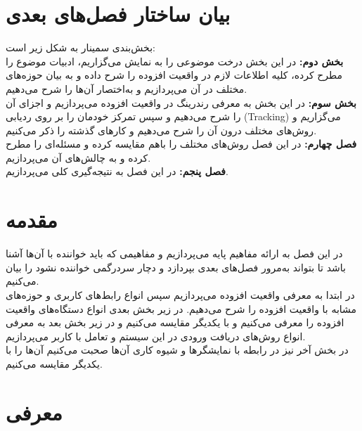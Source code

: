 \section{بیان ساختار فصل‌های بعدی}
بخش‌بندی سمینار به شکل زیر است:
\\
\textbf{
	بخش دوم:} در این بخش درخت موضوعی را به نمایش می‌گزاریم، ادبیات موضوع را مطرح کرده، کلیه اطلاعات لازم در واقعیت افزوده را شرح داده و به بیان حوزه‌های مختلف در آن می‌پردازیم و به‌اختصار آن‌ها را شرح می‌دهیم.
\\
\textbf{
	بخش سوم: } در این بخش به معرفی رندرینگ در واقعیت افزوده می‌پردازیم و اجزای آن را شرح می‌دهیم و سپس تمرکز خودمان را بر روی ردیابی (Tracking) می‌گزاریم و روش‌های مختلف درون آن را شرح می‌دهیم و کارهای گذشته را ذکر می‌کنیم.
\\
\textbf{
	فصل چهارم:} در این فصل روش‌های مختلف را باهم مقایسه کرده و مسئله‌ای را مطرح کرده و به چالش‌های آن می‌پردازیم.
\\
\textbf{
	فصل پنجم:} در این فصل به نتیجه‌گیری کلی می‌پردازیم.

\section{مقدمه}
در این فصل به ارائه مفاهیم پایه می‌پردازیم و مفاهیمی که  باید خواننده با آن‌ها آشنا باشد تا بتواند به‌مرور فصل‌های بعدی بپردازد و دچار سردرگمی خواننده نشود را بیان می‌کنیم.
\\
در ابتدا به معرفی واقعیت افزوده می‌پردازیم سپس انواع رابط‌های کاربری و حوزه‌های مشابه با واقعیت افزوده را شرح می‌دهیم. در زیر بخش بعدی انواع دستگاه‌های واقعیت افزوده را معرفی می‌کنیم و با یکدیگر مقایسه می‌کنیم و در زیر بخش بعد به معرفی انواع روش‌های دریافت ورودی در این سیستم و تعامل با کاربر می‌پردازیم.
\\
در بخش آخر نیز در رابطه با نمایشگرها و شیوه کاری آن‌ها صحبت می‌کنیم آن‌ها را با یکدیگر مقایسه می‌کنیم.
\section{معرفی}
